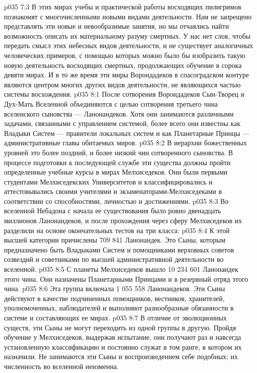 \vs p035 7:3 В этих мирах учебы и практической работы восходящих пилигримов познакомят с многочисленными новыми видами деятельности. Нам не запрещено представлять эти новые и невообразимые занятия, но мы отчаялись найти возможность описать их материальному разуму смертных. У нас нет слов, чтобы передать смысл этих небесных видов деятельности, и не существует аналогичных человеческих примеров, с помощью которых можно было бы изобразить такую новую деятельность восходящих смертных, продолжающих обучение в сорока девяти мирах. И в то же время эти миры Ворондадеков в спасоградском контуре являются центром многих других видов деятельности, не являющихся частью системы восхождения.
\vs p035 8:1 После сотворения Ворондадеков Сын\hyp{}Творец и Дух\hyp{}Мать Вселенной объединяются с целью сотворения третьего чина вселенского сыновства --- Ланонандеков. Хотя они занимаются различными задачами, связанными с управлением системой, более всего они известны как Владыки Систем --- правители локальных систем и как Планетарные Принцы --- административные главы обитаемых миров.
\vs p035 8:2 В иерархии божественных уровней это более поздний, и более низкий чин сотворенного сыновства. В процессе подготовки к последующей службе эти существа должны пройти определенные учебные курсы в мирах Мелхиседеков. Они были первыми студентами Мелхиседекских Университетов и классифицировались и аттестовывались своими учителями и экзаменаторами\hyp{}Мелхиседеками в соответствии со способностями, личностью и достижениями.
\vs p035 8:3 Во вселенной Небадона с начала ее существования было ровно двенадцать миллионов Ланонандеков, и после прохождения через сферу Мелхиседеков их разделили на основе окончательных тестов на три класса:
\vs p035 8:4 \bibnobreakspace {} К этой высшей категории причислены 709 841 Ланонандек. Это Сыны, которым предназначено быть Владыками Систем и помощниками верховных советов созвездий и советниками по высшей административной деятельности во вселенной.
\vs p035 8:5 \pc {}\bibnobreakspace {} С планеты Мелхиседеков вышло 10 234 601 Ланонандек этого чина. Они назначены Планетарными Принцами и в резервный отряд этого чина.
\vs p035 8:6 \pc {}\bibnobreakspace {} Эта группа включала 1 055 558 Ланонандеков. Эти Сыны действуют в качестве подчиненных помощников, вестников, хранителей, уполномоченных, наблюдателей и выполняют разнообразные обязанности в системе и составляющих ее мирах.
\vs p035 8:7 \pc В отличие от эволюционных существ, эти Сыны не могут переходить из одной группы в другую. Пройдя обучение у Мелхиседеков, выдержав испытание, они получают раз и навсегда установленную классификацию и постоянно служат в том ранге, в котором их назначили. Не занимаются эти Сыны и воспроизведением себе подобных; их численность во вселенной неизменна.
